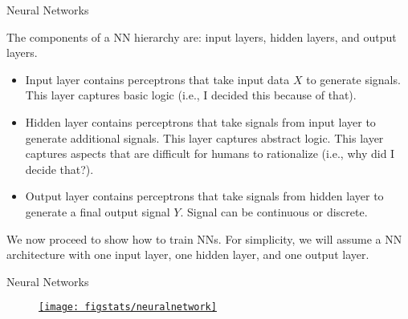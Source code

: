 \documentclass[handout,9pt]{beamer}
\begin{document}

\begin{frame}{Neural Networks}

The components of a NN hierarchy are: input layers,  hidden layers, and output layers.
\begin{block}{}
\begin{itemize}
   \setlength{\itemsep}{10pt}
\item Input layer contains perceptrons that take input data $X$ to generate signals. This layer captures basic logic (i.e., I decided  this because of that). 
\item Hidden layer contains perceptrons that take signals from input layer to generate additional signals. This layer captures abstract logic. This layer captures aspects that are difficult for humans to rationalize (i.e., why did I decide that?). 
\item Output layer contains perceptrons that take signals from hidden layer to generate a final output signal $Y$. Signal can be continuous or discrete. 
\end{itemize}
\end{block}
We now proceed to show how to train NNs. For simplicity, we will assume a NN architecture with one input layer, one hidden layer, and one output layer. 

\end{frame}


\begin{frame}{Neural Networks}

\begin{figure}[!htb]
    \centering
	\href{https://www.neuraldesigner.com/learning/tutorials/neural-network}{\texttt{[image: figstats/neuralnetwork]}}
\end{figure}

\end{frame}

\end{document}

